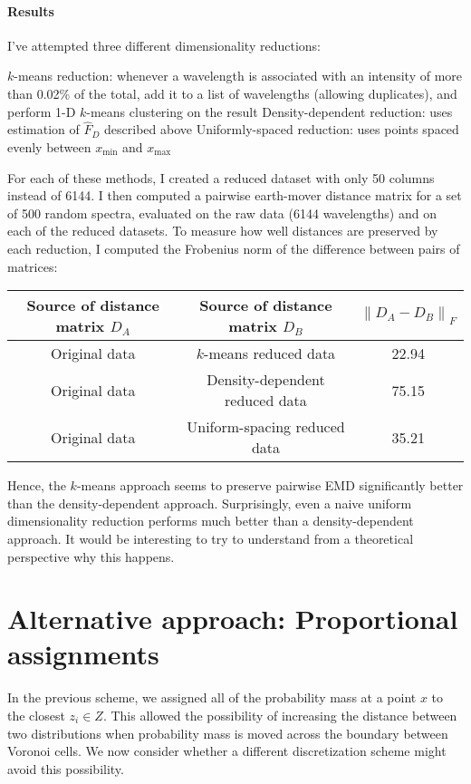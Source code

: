\documentclass[11pt]{article}
\newcommand{\norm}[1]{\left\lVert#1\right\rVert}
\newcommand{\xmin}{x_\mathrm{min}}
\newcommand{\xmax}{x_\mathrm{max}}
\theoremstyle{definition}
\begin{document}
\paragraph{Results} I've attempted three different dimensionality reductions:

\begin{outline}[enumerate]
\1 $k$-means reduction: whenever a wavelength is associated with an intensity of more than 0.02\% of the total, add it to a list of wavelengths (allowing duplicates), and perform 1-D $k$-means clustering on the result
\1 Density-dependent reduction: uses estimation of $\hat F_D$ described above
\1 Uniformly-spaced reduction: uses points spaced evenly between $\xmin$ and $\xmax$
\end{outline}

For each of these methods, I created a reduced dataset with only 50 columns instead of 6144.
I then computed a pairwise earth-mover distance matrix for a set of 500 random spectra, evaluated on the raw data (6144 wavelengths) and on each of the reduced datasets.
To measure how well distances are preserved by each reduction, I computed the Frobenius norm of the difference between pairs of matrices:
\begin{center}
\begin{tabular}{c|c|c}
Source of distance matrix $D_A$ & Source of distance matrix $D_B$ & $\norm{D_A-D_B}_F$ \\ \hline
Original data & $k$-means reduced data         & 22.94 \\
Original data & Density-dependent reduced data & 75.15 \\
Original data & Uniform-spacing reduced data   & 35.21
\end{tabular}
\end{center}

Hence, the $k$-means approach seems to preserve pairwise EMD significantly better than the density-dependent approach.  Surprisingly, even a naive uniform dimensionality reduction performs much better than a density-dependent approach.  It would be interesting to try to understand from a theoretical perspective why this happens.

\section*{Alternative approach: Proportional assignments}

In the previous scheme, we assigned all of the probability mass at a point $x$ to the closest $z_i \in Z$.  This allowed the possibility of increasing the distance between two distributions when probability mass is moved across the boundary between Voronoi cells.  We now consider whether a different discretization scheme might avoid this possibility.
\end{document}
